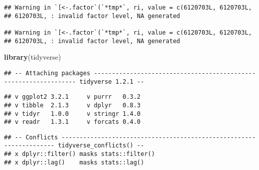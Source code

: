 \documentclass[]{article}
\newenvironment{Shaded}{\begin{snugshade}}{\end{snugshade}}
\newcommand{\KeywordTok}[1]{\textcolor[rgb]{0.13,0.29,0.53}{\textbf{#1}}}
\newcommand{\NormalTok}[1]{#1}
\begin{document}
\begin{verbatim}
## Warning in `[<-.factor`(`*tmp*`, ri, value = c(6120703L, 6120703L,
## 6120703L, : invalid factor level, NA generated

## Warning in `[<-.factor`(`*tmp*`, ri, value = c(6120703L, 6120703L,
## 6120703L, : invalid factor level, NA generated
\end{verbatim}

\begin{Shaded}
\begin{Highlighting}[]
\KeywordTok{library}\NormalTok{(tidyverse)}
\end{Highlighting}
\end{Shaded}

\begin{verbatim}
## -- Attaching packages ----------------------------------------------------------------- tidyverse 1.2.1 --
\end{verbatim}

\begin{verbatim}
## v ggplot2 3.2.1     v purrr   0.3.2
## v tibble  2.1.3     v dplyr   0.8.3
## v tidyr   1.0.0     v stringr 1.4.0
## v readr   1.3.1     v forcats 0.4.0
\end{verbatim}

\begin{verbatim}
## -- Conflicts -------------------------------------------------------------------- tidyverse_conflicts() --
## x dplyr::filter() masks stats::filter()
## x dplyr::lag()    masks stats::lag()
\end{verbatim}
\end{document}
